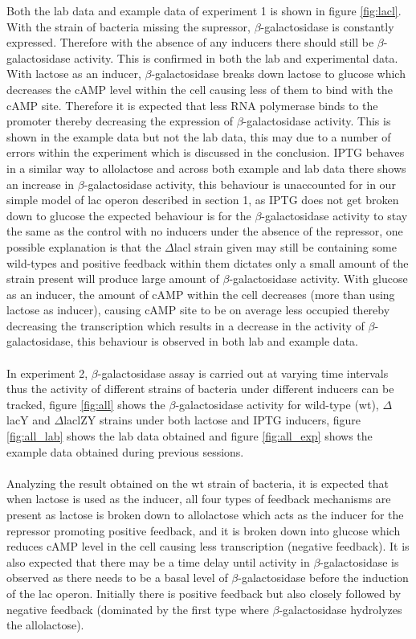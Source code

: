 \documentclass{article}
\begin{document}
Both the lab data and example data of experiment 1 is shown in figure \ref{fig:lacl}. With the strain of bacteria missing the supressor, $\beta$-galactosidase is constantly expressed. Therefore with the absence of any inducers there should still be $\beta$-galactosidase activity. This is confirmed in both the lab and experimental data. With lactose as an inducer, $\beta$-galactosidase breaks down lactose to glucose which decreases the cAMP level within the cell causing less of them to bind with the cAMP site. Therefore it is expected that less RNA polymerase binds to the promoter thereby decreasing the expression of $\beta$-galactosidase activity. This is shown in the example data but not the lab data, this may due to a number of errors within the experiment which is discussed in the conclusion. IPTG behaves in a similar way to allolactose and across both example and lab data there shows an increase in $\beta$-galactosidase activity, this behaviour is unaccounted for in our simple model of lac operon described in section 1, as IPTG does not get broken down to glucose the expected behaviour is for the $\beta$-galactosidase activity to stay the same as the control with no inducers under the absence of the repressor, one possible explanation is that the $\Delta$lacl strain given may still be containing some wild-types and positive feedback within them dictates only a small amount of the strain present will produce large amount of $\beta$-galactosidase activity. With glucose as an inducer, the amount of cAMP within the cell decreases (more than using lactose as inducer), causing cAMP site to be on average less occupied thereby decreasing the transcription which results in a decrease in the activity of $\beta$-galactosidase, this behaviour is observed in both lab and example data.\\ \\
In experiment 2, $\beta$-galactosidase assay is carried out at varying time intervals thus the activity of different strains of bacteria under different inducers can be tracked, figure \ref{fig:all} shows the $\beta$-galactosidase activity for wild-type (wt), $\Delta$lacY and $\Delta$laclZY strains under both lactose and IPTG inducers, figure \ref{fig:all_lab} shows the lab data obtained and figure \ref{fig:all_exp} shows the example data obtained during previous sessions.\\ \\
Analyzing the result obtained on the wt strain of bacteria, it is expected that when lactose is used as the inducer, all four types of feedback mechanisms are present as lactose is broken down to allolactose which acts as the inducer for the repressor promoting positive feedback, and it is broken down into glucose which reduces cAMP level in the cell causing less transcription (negative feedback). It is also expected that there may be a time delay until activity in $\beta$-galactosidase is observed as there needs to be a basal level of $\beta$-galactosidase before the induction of the lac operon. Initially there is positive feedback but also closely followed by negative feedback (dominated by the first type where $\beta$-galactosidase hydrolyzes the allolactose).
\end{document}
